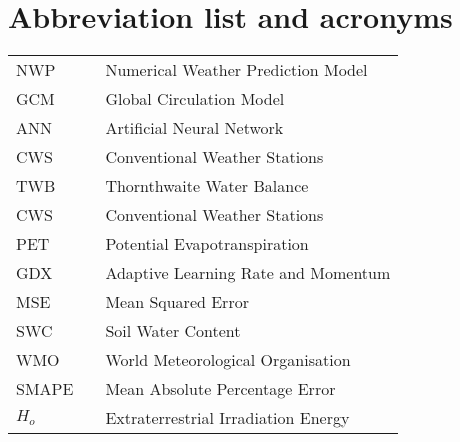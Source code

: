 \chapter*{Abbreviation list and acronyms}

\vspace*{-0.5cm}

\onehalfspacing


\noindent
\begin{tabular}{l c p{.85\linewidth}}
NWP                & & Numerical Weather Prediction Model\\

GCM                & & Global Circulation Model\\

ANN                & & Artificial Neural Network\\

CWS                & & Conventional Weather Stations\\

TWB                & & Thornthwaite  Water Balance\\

CWS                & & Conventional Weather Stations\\

PET                & & Potential Evapotranspiration\\

GDX                & & Adaptive Learning Rate and Momentum\\

MSE                & & Mean Squared Error\\ 

SWC                & & Soil Water Content\\ 

WMO                & & World Meteorological Organisation\\ 

SMAPE              & & Mean Absolute Percentage Error\\ 

$H_o$              & & Extraterrestrial Irradiation Energy\\


\end{tabular}

%
 
